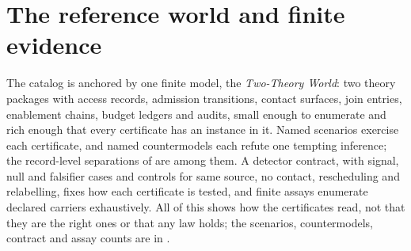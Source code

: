 \section{The reference world and finite evidence}
\label{sec:ttw}

The catalog is anchored by one finite model, the \emph{Two-Theory World}: two theory packages
with access records, admission transitions, contact surfaces, join entries, enablement chains,
budget ledgers and audits, small enough to enumerate and rich enough that every certificate has
an instance in it. Named scenarios exercise each certificate, and named countermodels each refute
one tempting inference; the record-level separations of  are among them. A
detector contract, with signal, null and falsifier cases and controls for same source, no contact,
rescheduling and relabelling, fixes how each certificate is tested, and finite assays enumerate
declared carriers exhaustively. All of this shows how the certificates read, not that they are the
right ones or that any law holds; the scenarios, countermodels, contract and assay counts are in
.
